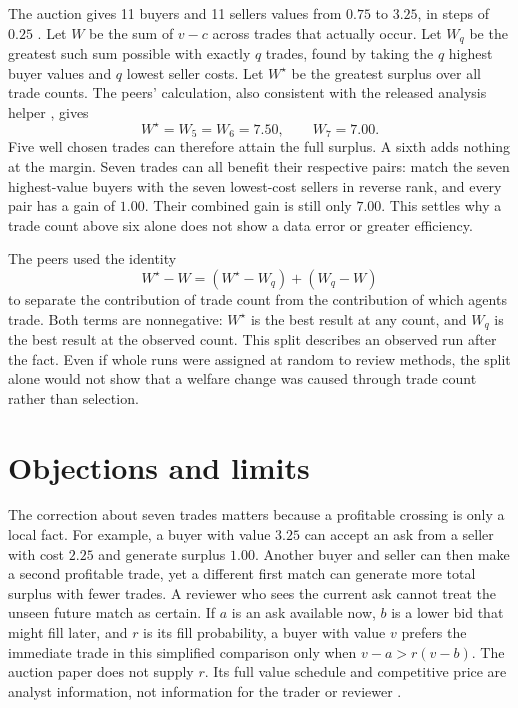 \documentclass{article}
\begin{document}
The auction gives 11 buyers and 11 sellers values from \(0.75\) to \(3.25\), in steps of \(0.25\) \cite{Q}.
Let \(W\) be the sum of \(v-c\) across trades that actually occur. Let \(W_q\) be the greatest such sum
possible with exactly \(q\) trades, found by taking the \(q\) highest buyer values and \(q\) lowest seller
costs. Let \(W^{\star}\) be the greatest surplus over all trade counts. The peers' calculation, also
consistent with the released analysis helper \cite{Qanalysis}, gives
\[
  W^{\star}=W_5=W_6=7.50, \qquad W_7=7.00.
\]
Five well chosen trades can therefore attain the full surplus. A sixth adds nothing at the margin. Seven
trades can all benefit their respective pairs: match the seven highest-value buyers with the seven lowest-cost
sellers in reverse rank, and every pair has a gain of \(1.00\). Their combined gain is still only \(7.00\).
This settles why a trade count above six alone does not show a data error or greater efficiency.

The peers used the identity
\[
  W^{\star}-W=(W^{\star}-W_q)+(W_q-W)
\]
to separate the contribution of trade count from the contribution of which agents trade. Both terms are
nonnegative: \(W^{\star}\) is the best result at any count, and \(W_q\) is the best result at the observed
count. This split describes an observed run after the fact. Even if whole runs were assigned at random to
review methods, the split alone would not show that a welfare change was caused through trade count rather
than selection.

\section{Objections and limits}

The correction about seven trades matters because a profitable crossing is only a local fact. For example, a
buyer with value \(3.25\) can accept an ask from a seller with cost \(2.25\) and generate surplus \(1.00\).
Another buyer and seller can then make a second profitable trade, yet a different first match can generate
more total surplus with fewer trades. A reviewer who sees the current ask cannot treat the unseen future match
as certain. If \(a\) is an ask available now, \(b\) is a lower bid that might fill later, and \(r\) is its
fill probability, a buyer with value \(v\) prefers the immediate trade in this simplified comparison only when
\(v-a>r(v-b)\). The auction paper does not supply \(r\). Its full value schedule and competitive price are
analyst information, not information for the trader or reviewer \cite{Q}.
\end{document}
